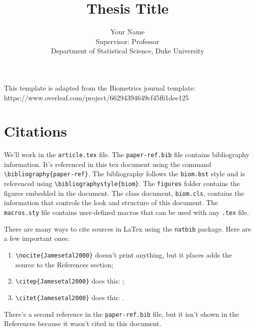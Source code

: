 \documentclass[useAMS, referee, usenatbib]{biom}
\title{Thesis Title}
\author{Your Name\\
Supervisor: Professor\\Department of Statistical Science, Duke University}
\begin{document}
\pagerange{\pageref{firstpage}--\pageref{lastpage}} 
\volume{}
\pubyear{}
\artmonth{}

\doi{}

\label{firstpage}


\begin{abstract}
\lipsum[1]
\end{abstract}

\maketitle

\noindent
This template is adapted from the Biometrics journal template:\\
https://www.overleaf.com/project/66294394649cf45f61dee125

\section*{Citations}
We'll work in the \texttt{article.tex} file.
The \texttt{paper-ref.bib} file contains bibliography information. It's referenced in this tex document using the command \texttt{\textbackslash bibliography\{paper-ref\}}. The bibliography follows the \texttt{biom.bst} style and is referenced using \texttt{\textbackslash bibliographystyle\{biom\}}. The \texttt{figures} folder contains the figures embedded in the document. The class document, \texttt{biom.cls}, contains the information that controls the look and structure of this document. The \texttt{macros.sty} file contains user-defined macros that can be used with any \texttt{.tex} file.

\noindent
There are many ways to cite sources in LaTex using the \texttt{natbib} package. Here are a few important ones:
\begin{enumerate}
\item \texttt{\textbackslash nocite\{Jamesetal2000\}} doesn't print anything, but it places adds the source to the References section\nocite{Jamesetal2000};
\item \texttt{\textbackslash citep\{Jamesetal2000\}} does this: \citep{Jamesetal2000};
\item \texttt{\textbackslash citet\{Jamesetal2000\}} does this: \citet{Jamesetal2000}.
\end{enumerate}
There's a second reference in the \texttt{paper-ref.bib} file, but it isn't shown in the References because it wasn't cited in this document.
\end{document}
